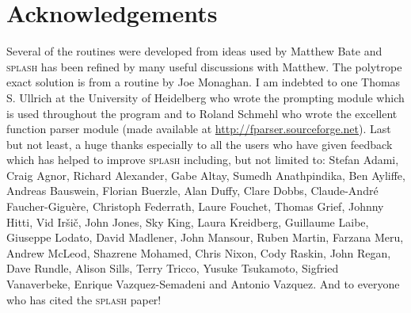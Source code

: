 \documentclass[a4paper,10pt]{article}
\newcommand{\splash}{\textsc{splash }}
\begin{document}
\section*{Acknowledgements}%
 Several of the routines were developed from ideas used by Matthew Bate and \splash has been refined by many useful discussions with Matthew. The
polytrope exact solution is from a routine by Joe Monaghan. I am indebted to one Thomas S. Ullrich at the University of Heidelberg who wrote the prompting module
which is used throughout the program and to Roland Schmehl who wrote the excellent function parser module (made available at \url{http://fparser.sourceforge.net}). Last but not least, a huge thanks especially to all the users who have given feedback which has helped to improve \splash including, but not limited to:
 Stefan Adami, 
 Craig Agnor,
 Richard Alexander, 
 Gabe Altay,
 Sumedh Anathpindika,
 Ben Ayliffe,
 Andreas Bauswein,
 Florian Buerzle,
 Alan Duffy,
 Clare Dobbs,
 Claude-Andr\'e Faucher-Gigu\`ere,
 Christoph Federrath,
 Laure Fouchet,
 Thomas Grief,
 Johnny Hitti,
 Vid Ir\v{s}i\v{c},
 John Jones,
 Sky King,
 Laura Kreidberg,
 Guillaume Laibe,
 Giuseppe Lodato,
 David Madlener,
 John Mansour,
 Ruben Martin,
 Farzana Meru,
 Andrew McLeod,
 Shazrene Mohamed,
 Chris Nixon,
 Cody Raskin,
 John Regan,
 Dave Rundle,
 Alison Sills,
 Terry Tricco,
 Yusuke Tsukamoto,
 Sigfried Vanaverbeke,
 Enrique Vazquez-Semadeni
 and Antonio Vazquez.
And to everyone who has cited the \splash paper!

\newpage
\appendix
\end{document}
